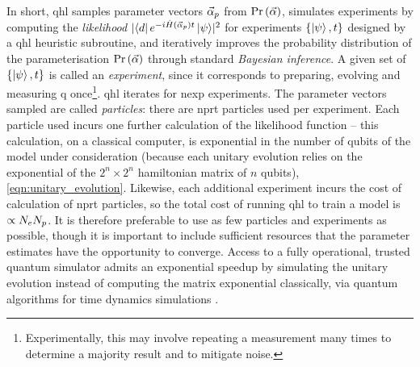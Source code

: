 In short, \gls{qhl} samples parameter vectors $\vec{\alpha}_p$ from $\Pr\left(\vec{\alpha}\right)$, 
    simulates \glspl{experiment} by computing the \emph{likelihood} $\lvert \bra{d} e^{-i \hat{H}(\vec{\alpha}_p)t} \ket{\psi} \rvert^2$
    for \glspl{experiment} $\{\ket{\psi}, t\}$ designed by a \gls{qhl} heuristic subroutine, 
    and iteratively improves the probability distribution of the parameterisation $\Pr\left(\vec{\alpha}\right)$ 
    through standard \emph{Bayesian inference}. 
A given set of $\{\ket{\psi}, t\}$ is called an \emph{experiment}, since it corresponds to preparing, evolving and measuring \gls{q} 
once\footnote{Experimentally, this may involve repeating a measurement many times to determine a majority result and to mitigate noise.}. 
\gls{qhl} iterates for \gls{nexp} \glspl{experiment}. 
The parameter vectors sampled are called \emph{\glspl{particle}}: there are \gls{nprt} \glspl{particle} used per experiment. 
Each \gls{particle} used incurs one further calculation of the \gls{likelihood} function -- 
    this calculation, on a classical computer, is exponential in the number of qubits of the model under consideration
    (because each unitary evolution relies on the exponential of the $2^n \times 2^n$ \gls{hamiltonian} matrix of $n$ qubits), 
    \cref{eqn:unitary_evolution}. 
Likewise, each additional \gls{experiment} incurs the cost of calculation of \gls{nprt} \glspl{particle}, 
    so the total cost of running \gls{qhl} to train a model is $\propto N_e N_p$.
It is therefore preferable to use as few \glspl{particle} and \glspl{experiment} as possible, 
    though it is important to include sufficient resources that the parameter estimates have the opportunity to converge. 
Access to a fully operational, trusted quantum simulator admits an exponential 
    speedup by simulating the unitary evolution instead of computing the matrix exponential classically, 
    via quantum algorithms for time dynamics simulations \cite{childs2018toward, kivlichan2017bounding, childs2012hamiltonian}.
\par 

